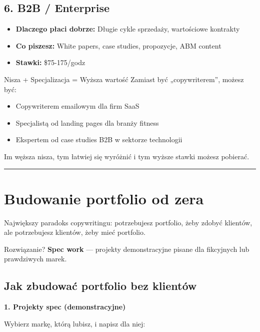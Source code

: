 \documentclass[
  12pt,
  a4paper,
  twoside,
  openright,
  12pt,
  DIV=12,
  BCOR=12mm]{scrbook}
\providecommand{\tightlist}{%
  \setlength{\itemsep}{0pt}\setlength{\parskip}{0pt}}\usepackage{longtable,booktabs,array}
\newcommand{\decoline}{%
  \begin{center}
    \textcolor{bordergray}{\rule{0.3\textwidth}{0.5pt}}
  \end{center}
}
\begin{document}
\subsection{6. B2B / Enterprise}\label{b2b-enterprise}

\begin{itemize}
\tightlist
\item
  \textbf{Dlaczego płaci dobrze:} Długie cykle sprzedaży, wartościowe
  kontrakty
\item
  \textbf{Co piszesz:} White papers, case studies, propozycje, ABM
  content
\item
  \textbf{Stawki:} \$75-175/godz
\end{itemize}

\begin{przyklad}{Nisza + Specjalizacja = Wyższa wartość}
Zamiast być „copywriterem”, możesz być:
\begin{itemize}
  \item Copywriterem emailowym dla firm SaaS
  \item Specjalistą od landing pages dla branży fitness
  \item Ekspertem od case studies B2B w sektorze technologii
\end{itemize}

Im węższa nisza, tym łatwiej się wyróżnić i tym wyższe stawki możesz pobierać.
\end{przyklad}

\decoline

\section{Budowanie portfolio od zera}\label{budowanie-portfolio-od-zera}

Największy paradoks copywritingu: potrzebujesz portfolio, żeby zdobyć
klientów, ale potrzebujesz klientów, żeby mieć portfolio.

Rozwiązanie? \textbf{Spec work} --- projekty demonstracyjne pisane dla
fikcyjnych lub prawdziwych marek.

\subsection{Jak zbudować portfolio bez
klientów}\label{jak-zbudowaux107-portfolio-bez-klientuxf3w}

\textbf{1. Projekty spec (demonstracyjne)}

Wybierz markę, którą lubisz, i napisz dla niej:
\end{document}

